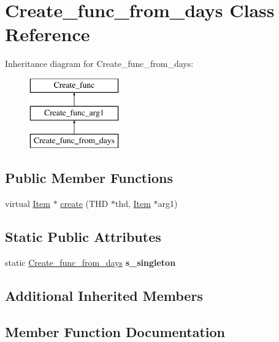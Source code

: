 \hypertarget{classCreate__func__from__days}{}\section{Create\+\_\+func\+\_\+from\+\_\+days Class Reference}
\label{classCreate__func__from__days}
Inheritance diagram for Create\+\_\+func\+\_\+from\+\_\+days\+:\begin{figure}[H]
\begin{center}
\leavevmode
\includegraphics[height=3.000000cm]{classCreate__func__from__days}
\end{center}
\end{figure}
\subsection*{Public Member Functions}
\begin{DoxyCompactItemize}
\item 
virtual \mbox{\hyperlink{classItem}{Item}} $\ast$ \mbox{\hyperlink{classCreate__func__from__days_a720ab4e3f595b01bbafe8e5e1ad36c43}{create}} (T\+HD $\ast$thd, \mbox{\hyperlink{classItem}{Item}} $\ast$arg1)
\end{DoxyCompactItemize}
\subsection*{Static Public Attributes}
\begin{DoxyCompactItemize}
\item 
\mbox{\label{classCreate__func__from__days_a7e3b37b51c11659391a19d34c0a00873}} 
static \mbox{\hyperlink{classCreate__func__from__days}{Create\+\_\+func\+\_\+from\+\_\+days}} {\bfseries s\+\_\+singleton}
\end{DoxyCompactItemize}
\subsection*{Additional Inherited Members}


\subsection{Member Function Documentation}
\mbox{\label{classCreate__func__from__days_a720ab4e3f595b01bbafe8e5e1ad36c43}} 
